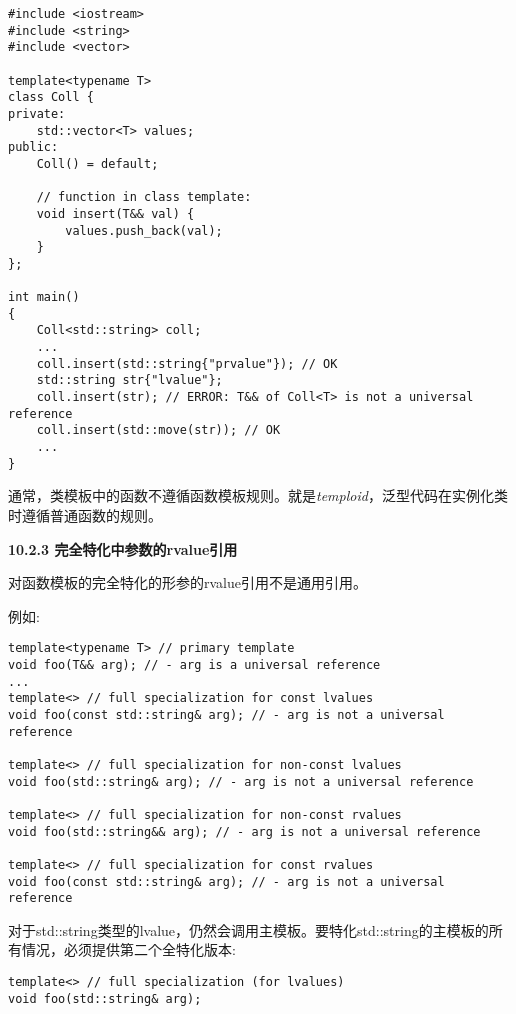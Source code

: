 \begin{lstlisting}[caption={}]
#include <iostream>
#include <string>
#include <vector>

template<typename T>
class Coll {
private:
	std::vector<T> values;
public:
	Coll() = default;
	
	// function in class template:
	void insert(T&& val) {
		values.push_back(val);
	}
};

int main()
{
	Coll<std::string> coll;
	...
	coll.insert(std::string{"prvalue"}); // OK
	std::string str{"lvalue"};
	coll.insert(str); // ERROR: T&& of Coll<T> is not a universal reference
	coll.insert(std::move(str)); // OK
	...
}
\end{lstlisting}

通常，类模板中的函数不遵循函数模板规则。就是\textit{temploid}，泛型代码在实例化类时遵循普通函数的规则。\par

\hspace*{\fill} \par %
\textbf{10.2.3 完全特化中参数的rvalue引用}

对函数模板的完全特化的形参的rvalue引用不是通用引用。\par

例如:\par

\begin{lstlisting}[caption={}]
template<typename T> // primary template
void foo(T&& arg); // - arg is a universal reference
...
template<> // full specialization for const lvalues
void foo(const std::string& arg); // - arg is not a universal reference

template<> // full specialization for non-const lvalues
void foo(std::string& arg); // - arg is not a universal reference

template<> // full specialization for non-const rvalues
void foo(std::string&& arg); // - arg is not a universal reference

template<> // full specialization for const rvalues
void foo(const std::string& arg); // - arg is not a universal reference
\end{lstlisting}

对于std::string类型的lvalue，仍然会调用主模板。要特化std::string的主模板的所有情况，必须提供第二个全特化版本:\par

\begin{lstlisting}[caption={}]
template<> // full specialization (for lvalues)
void foo(std::string& arg);
\end{lstlisting}

